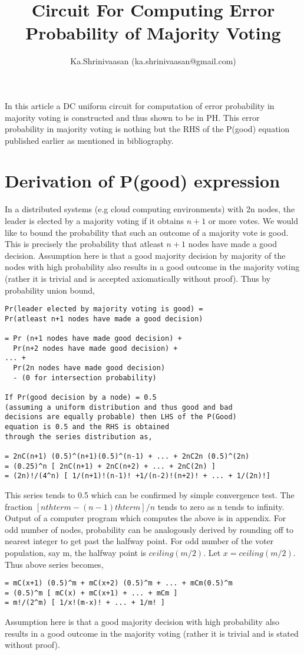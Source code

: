 \documentclass[11pt,onecolumn]{article}
\author{ Ka.Shrinivaasan (ka.shrinivaasan@gmail.com) }
\title{Circuit For Computing Error Probability of Majority Voting}
\begin{document}
\thispagestyle{empty}
\pagestyle{empty}
\maketitle
\begin{onecolabstract}
In this article a DC uniform circuit for computation of error probability in majority voting is
constructed and thus shown to be in PH. This error probability in majority voting is nothing but
the RHS of the P(good) equation published earlier as mentioned in bibliography.
\end{onecolabstract}
\section{Derivation of P(good) expression}
In a distributed systems (e.g cloud computing environments) with 2n nodes, the leader is elected
by a majority voting if it obtains $n+1$ or more votes. We would like to bound the probability that
such an outcome of a majority vote is good. This is precisely the probability that atleast $n+1$
nodes have made a good decision. Assumption here is that a good majority decision by majority
of the nodes with high probability also results in a good outcome in the majority voting (rather it
is trivial and is accepted axiomatically without proof). Thus by probability union bound,
\begin{verbatim}
Pr(leader elected by majority voting is good) = 
Pr(atleast n+1 nodes have made a good decision)

= Pr (n+1 nodes have made good decision) +
  Pr(n+2 nodes have made good decision) +
... +
  Pr(2n nodes have made good decision)
  - (0 for intersection probability)

If Pr(good decision by a node) = 0.5 
(assuming a uniform distribution and thus good and bad
decisions are equally probable) then LHS of the P(Good) 
equation is 0.5 and the RHS is obtained
through the series distribution as,

= 2nC(n+1) (0.5)^(n+1)(0.5)^(n-1) + ... + 2nC2n (0.5)^(2n)
= (0.25)^n [ 2nC(n+1) + 2nC(n+2) + ... + 2nC(2n) ]
= (2n)!/(4^n) [ 1/(n+1)!(n-1)! +1/(n-2)!(n+2)! + ... + 1/(2n)!]
\end{verbatim}
This series tends to 0.5 which can be confirmed by simple convergence test. The fraction $[nthterm  - (n-1)thterm] / n$  tends to zero as n tends to infinity. Output of a computer program which computes the above is in appendix.
For odd number of nodes, probability can be analogously derived by rounding off to nearest integer to get past the halfway point. For odd number of the voter population, say m, the halfway
point is $ceiling(m/2)$. Let $x=ceiling(m/2)$. Thus above series becomes,
\begin{verbatim}
= mC(x+1) (0.5)^m + mC(x+2) (0.5)^m + ... + mCm(0.5)^m
= (0.5)^m [ mC(x) + mC(x+1) + ... + mCm ]
= m!/(2^m) [ 1/x!(m-x)! + ... + 1/m! ]
\end{verbatim}
Assumption here is that a good majority decision with high probability also results in a good
outcome in the majority voting (rather it is trivial and is stated without proof).
\end{document}

